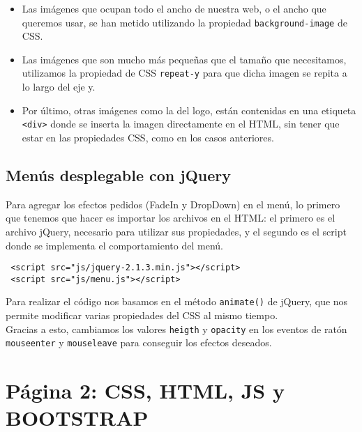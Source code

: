 \documentclass[10pt,a4paper]{article}
\begin{document}
\begin{itemize}

\item Las imágenes que ocupan todo el ancho de nuestra web, o el ancho que queremos usar, se han metido utilizando la propiedad \texttt{background-image} de CSS.

\item Las imágenes que son mucho más pequeñas que el tamaño que necesitamos, utilizamos la propiedad de CSS \texttt{repeat-y} para que dicha imagen se repita a lo largo del eje y.

\item Por último, otras imágenes como la del logo, están contenidas en una etiqueta \texttt{<div>} donde se inserta la imagen directamente en el HTML, sin tener que estar en las propiedades CSS, como en los casos anteriores. 

\end{itemize}

\subsection{Menús desplegable con jQuery}

Para agregar los efectos pedidos (FadeIn y DropDown) en el menú, lo primero que tenemos que hacer es importar los archivos en el HTML: el primero es el archivo jQuery, necesario para utilizar sus propiedades, y el segundo es el script donde se implementa el comportamiento del menú.

\begin{verbatim}
 <script src="js/jquery-2.1.3.min.js"></script>
 <script src="js/menu.js"></script>
\end{verbatim}
 
Para realizar el código nos basamos en el método \texttt{animate()} de jQuery, que nos permite modificar varias propiedades del CSS al mismo tiempo.\\

Gracias a esto, cambiamos los valores \texttt{heigth} y \texttt{opacity} en los eventos de ratón \texttt{mouseenter} y \texttt{mouseleave} para conseguir los efectos deseados.

\section{Página 2: CSS, HTML, JS y BOOTSTRAP}
\end{document}
